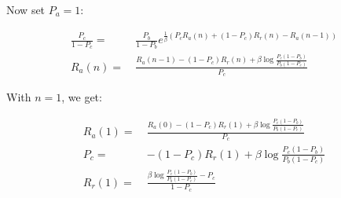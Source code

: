 \documentclass{article}
\begin{document}
Now set $P_a = 1$:

\begin{align*}
  \frac{P_c}{1 - P_c} = \: & \frac{P_b}{1 - P_b} e^{\frac{1}{\beta} \left(P_cR_a(n) + (1 - P_c)R_r(n) - R_a(n - 1)\right)} \\
  R_a(n) = \:              & \frac{R_a(n - 1) - (1 - P_c)R_r(n) + \beta \log \frac{P_c (1 - P_b)}{P_b (1 - P_c)}}{P_c}
\end{align*}

With $n = 1$, we get:

\begin{align*}
  R_a(1) = \: & \frac{R_a(0) - (1 - P_c)R_r(1) + \beta \log \frac{P_c (1 - P_b)}{P_b (1 - P_c)}}{P_c} \\
  P_c = \:    & - (1 - P_c)R_r(1) + \beta \log \frac{P_c (1 - P_b)}{P_b (1 - P_c)}                    \\
  R_r(1) = \: & \frac{\beta \log \frac{P_c (1 - P_b)}{P_b (1 - P_c)} - P_c}{1 - P_c}
\end{align*}
\end{document}
